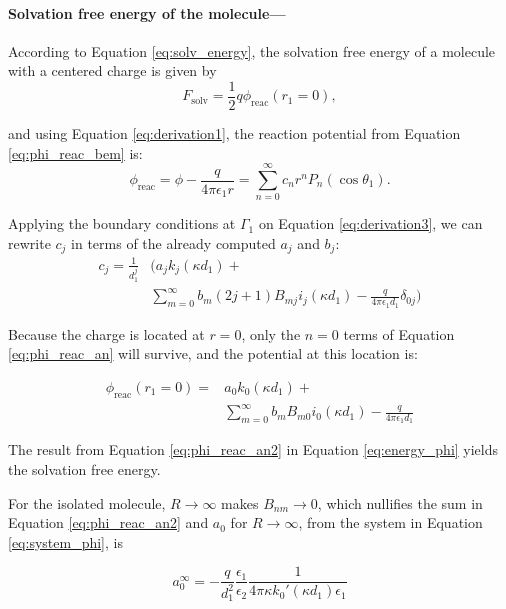  \medskip
 \paragraph*{Solvation free energy of the molecule---}
According to Equation \eqref{eq:solv_energy}, the solvation free energy of a molecule with a centered charge is given by
%
\begin{equation} \label{eq:energy_phi}
F_{\text{solv}} = \frac{1}{2} q \phi_{\text{reac}}(r_1=0),
\end{equation} 
 
 \noindent and using Equation \eqref{eq:derivation1}, the reaction potential from Equation \eqref{eq:phi_reac_bem} is:
 \begin{equation} \label{eq:phi_reac_an}
 \phi_{\text{reac}} = \phi - \frac{q}{4\pi\epsilon_1 r} = \sum_{n=0}^{\infty} c_n r^n P_n(\cos \theta_1).
 \end{equation}
 
 Applying the boundary conditions at $\Gamma_1$ on Equation  \eqref{eq:derivation3}, we can rewrite $c_j$ in terms of the already computed $a_j$ and $b_j$:
 \begin{align}
 c_j = \frac{1}{d_1^j} & \Big(a_j k_j(\kappa d_1) + \nonumber \\
&  \sum_{m=0}^{\infty} b_m(2j+1)B_{mj} i_j(\kappa d_1) - \frac{q}{4\pi\epsilon_1 d_1} \delta_{0j} \Big)
 \end{align} 
 
Because the charge is located at $r=0$, only the $n=0$ terms of Equation \eqref{eq:phi_reac_an} will survive, and the potential at this location is:
 
 \begin{align} \label{eq:phi_reac_an2}
 \phi_{\text{reac}} (r_1=0) = & a_0 k_0(\kappa d_1) + \nonumber \\
 &\sum_{m=0}^{\infty} b_m B_{m0}i_0(\kappa d_1) - \frac{q}{4\pi\epsilon_1 d_1}
 \end{align}
 
 The result from Equation \eqref{eq:phi_reac_an2} in Equation \eqref{eq:energy_phi} yields the solvation free energy. 
 
For the isolated molecule, $R \to \infty$ makes $B_{nm} \to 0$, which nullifies the sum in Equation \eqref{eq:phi_reac_an2} and $a_0$ for $R \to \infty$, from the system in Equation \eqref{eq:system_phi}, is 

\begin{equation} \label{eq:a0_inf}
a_0^{\infty} = -\frac{q}{d_1^2}\frac{\epsilon_1}{\epsilon_2} \frac{1}{4\pi\kappa k_0'(\kappa d_1) \epsilon_1}
\end{equation}


